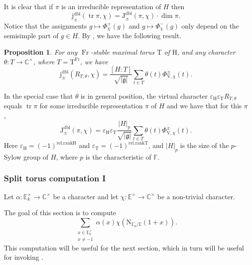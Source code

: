 \documentclass[12pt, reqno]{amsart}
\newtheorem{proposition}[theorem]{Proposition}
\theoremstyle{definition}
\theoremstyle{definition}
\theoremstyle{definition}
\newcommand{\cComplex}{\mathbb{C}}
\newcommand{\multiplicativegroup}[1]{#1^{\times}}
\newcommand{\sizeof}[1]{\left|#1\right|}
\newcommand{\hermitianSpace}{\mathrm{V}}
\newcommand{\grpIndex}[2]{\left[#1:#2\right]}
\newcommand{\trace}{\operatorname{tr}}
\newcommand{\aFieldNorm}{\mathrm{N}}
\newcommand{\finiteField}{\mathbb{F}}
\newcommand{\quadraticExtension}{\mathbb{E}}
\newcommand{\quadraticFieldExtension}[1]{\quadraticExtension_{#1}}
\newcommand{\Frobenius}{\operatorname{Fr}}
\newcommand{\posJacobiKernel}[1]{\Phi^{+}_{#1}}
\newcommand{\negJacobiKernel}[1]{\Phi^{-}_{#1}}
\newcommand{\genHermitianJacobiKernel}[2]{\Phi^{\pm}_{#1,#2}}
\newcommand{\dblJacobiSumScalar}[2]{\mathrm{J}_{\pm}^{\mathrm{dbl}}\left(#1, #2\right)}
\newcommand{\dblVirtualJacobiSumScalar}[2]{\mathrm{j}_{\pm}^{\mathrm{dbl}}\left(#1, #2\right)}
\newcommand{\lieAlgebra}{\mathfrak{g}}
\newcommand{\algebraicGroup}[1]{\boldsymbol{\mathrm{#1}}}
\begin{document}
It is clear that if $\pi$ is an irreducible representation of $H$ then $$\dblVirtualJacobiSumScalar{\trace \pi}{\chi} = \dblJacobiSumScalar{\pi}{\chi} \cdot \dim \pi.$$
Notice that the assignments $g \mapsto \posJacobiKernel{\chi}\left(g\right)$ and $g \mapsto \negJacobiKernel{\chi}\left(g\right)$ only depend on the semisimple part of $g \in H$. By , we have the following result.
\begin{proposition}\label{prop:reduction-of-gauss-sum-to-torus}
	For any $\Frobenius$-stable maximal torus $\algebraicGroup{T}$ of $\algebraicGroup{H}$, and any character $\theta \colon T \to \multiplicativegroup{\cComplex}$, where $T = \algebraicGroup{T}^{\Frobenius}$, we have
	$$ \dblVirtualJacobiSumScalar{R_{T, \theta}}{\chi} = \frac{\grpIndex{H}{T}}{\sqrt{\sizeof{\lieAlgebra}}} \sum_{t \in T} \theta\left(t\right) \genHermitianJacobiKernel{\hermitianSpace}{\chi}\left(t\right).$$
\end{proposition}
In the special case that $\theta$ is in general position, the virtual character $\varepsilon_{\algebraicGroup{H}} \varepsilon_{\algebraicGroup{T}} R_{T, \theta}$ equals $\trace \pi$ for some irreducible representation $\pi$ of $H$ and we have that for this $\pi$,
$$\dblJacobiSumScalar{\pi}{\chi} = \varepsilon_{\algebraicGroup{H}} \varepsilon_{\algebraicGroup{T}} \frac{\sizeof{H}_p}{\sqrt{\sizeof{\lieAlgebra}}} \sum_{t \in T} \theta\left(t\right) \genHermitianJacobiKernel{\hermitianSpace}{\chi}\left(t\right).$$
Here $\varepsilon_{\algebraicGroup{H}} = \left(-1\right)^{\mathrm{rel.rank} \algebraicGroup{H}}$ and $\varepsilon_{\algebraicGroup{T}} = \left(-1\right)^{\mathrm{rel.rank} \algebraicGroup{T}}$, and $\sizeof{H}_p$ is the size of the $p$-Sylow group of $H$, where $p$ is the characteristic of $\finiteField$. 

\subsubsection{Split torus computation I}
Let $\alpha \colon \multiplicativegroup{\quadraticFieldExtension{k}} \to \multiplicativegroup{\cComplex}$ be a character and let $\chi \colon \multiplicativegroup{\quadraticExtension} \to \multiplicativegroup{\cComplex}$ be a non-trivial character.

The goal of this section is to compute $$\sum_{\substack{x \in \multiplicativegroup{\quadraticFieldExtension{k}}\\
x \ne -1}} \alpha\left(x\right) \chi\left(\aFieldNorm_{\quadraticFieldExtension{k} \slash \quadraticExtension}\left(1+x\right)\right).$$
This computation will be useful for the next section, which in turn will be useful for invoking .
\end{document}
